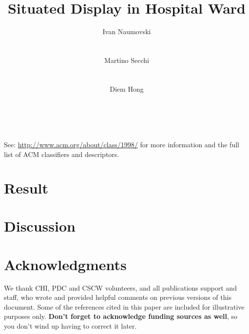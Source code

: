 \documentclass{sigchi}
\begin{document}
\title{Situated Display in Hospital Ward}

\author{
  \alignauthor Ivan Naumovski\\
    \\
    \\
  \alignauthor Martino Secchi\\
    \\
    \\
  \alignauthor Diem Hong\\
    \\
    \\
}

\maketitle

\begin{abstract}

\end{abstract}



See: \url{http://www.acm.org/about/class/1998/}
for more information and the full list of ACM classifiers
and descriptors. 







\section{Result}


\section{Discussion}


\section{Acknowledgments}
We thank CHI, PDC and CSCW volunteers, and all publications support
and staff, who wrote and provided helpful comments on previous
versions of this document.  Some of the references cited in this paper
are included for illustrative purposes only.  \textbf{Don't forget
to acknowledge funding sources as well}, so you don't wind up
having to correct it later.
\end{document}
